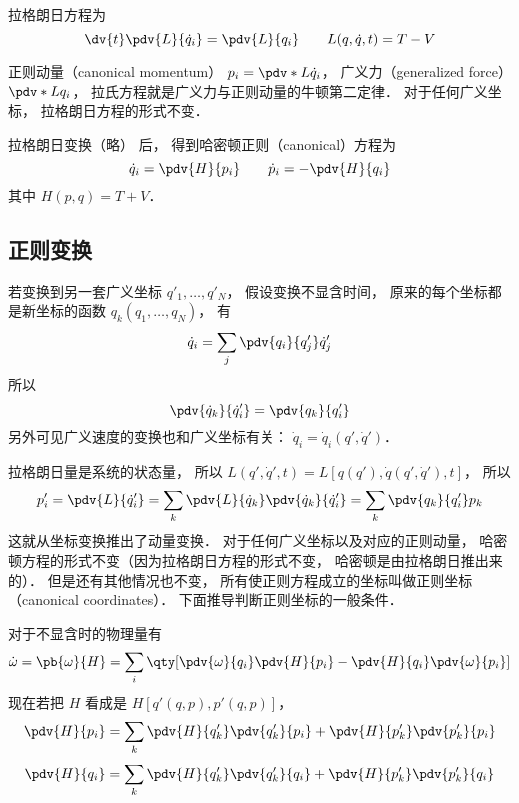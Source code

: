 
\begin{issues}
\issueDraft
\end{issues}


拉格朗日方程为
\begin{equation}
\dv{t} \pdv{L}{\dot q_i}  = \pdv{L}{q_i}  \qquad L(q,\dot q, t) = T - V
\end{equation}

正则动量（canonical momentum） $p_i = \pdv*{L}{\dot q_i}$，  广义力（generalized force） $\pdv*{L}{q_i}$，  拉氏方程就是广义力与正则动量的牛顿第二定律． 对于任何广义坐标， 拉格朗日方程的形式不变．

拉格朗日变换（略） 后， 得到哈密顿正则（canonical）方程为
\begin{equation}
\dot q_i = \pdv{H}{p_i} \qquad
\dot p_i = -\pdv{H}{q_i}
\end{equation} 
其中 $H(p,q) = T + V$． 


\subsection{正则变换}

若变换到另一套广义坐标 $q'_1, \dots, q'_N$， 假设变换不显含时间， 原来的每个坐标都是新坐标的函数 $q_k(q_1, \dots, q_N)$， 有
\begin{equation}
\dot q_i = \sum_j \pdv{q_i}{q'_j} \dot q'_j
\end{equation}
所以
\begin{equation}
\pdv{\dot q_k}{\dot q'_i} = \pdv{q_k}{q'_i}
\end{equation}
另外可见广义速度的变换也和广义坐标有关： $\dot q_i = \dot q_i(q', \dot q')$．

拉格朗日量是系统的状态量， 所以 $L(q',\dot q', t) = L[q(q'),\dot q(q',\dot q'), t]$，  所以
\begin{equation}
p'_i = \pdv{L}{\dot q'_i} = \sum_k \pdv{L}{\dot q_k} \pdv{\dot q_k}{\dot q'_i}  = \sum_k \pdv{q_k}{q'_i} p_k
\end{equation}
这就从坐标变换推出了动量变换． 对于任何广义坐标以及对应的正则动量， 哈密顿方程的形式不变（因为拉格朗日方程的形式不变， 哈密顿是由拉格朗日推出来的）． 但是还有其他情况也不变， 所有使正则方程成立的坐标叫做正则坐标（canonical coordinates）． 下面推导判断正则坐标的一般条件．

对于不显含时的物理量有
\begin{equation}
\dot \omega  = \pb{\omega}{H}  = \sum_i \qty[\pdv{\omega}{q_i}\pdv{H}{p_i} - \pdv{H}{q_i} \pdv{\omega}{p_i}]
\end{equation}
现在若把 $H$ 看成是 $H[q'(q,p),p'(q,p)]$，  
\begin{equation}
\pdv{H}{p_i} = \sum_k \pdv{H}{q'_k} \pdv{q'_k}{p_i} + \pdv{H}{p'_k} \pdv{p'_k}{p_i}
\end{equation}
\begin{equation}
\pdv{H}{q_i} = \sum_k \pdv{H}{q'_k} \pdv{q'_k}{q_i} + \pdv{H}{p'_k} \pdv{p'_k}{q_i}
\end{equation}
 
